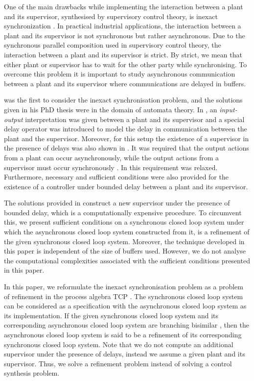 \documentclass[copyright]{eptcs}
\theoremstyle{plain}
\theoremstyle{definition}
\begin{document}
One of the main drawbacks while implementing the interaction between a plant and its supervisor, synthesised by supervisory control theory, is inexact synchronization \citep{fabian}. In practical industrial applications, the interaction between a plant and its supervisor is not synchronous but rather asynchronous. Due to the synchronous parallel composition used in supervisory control theory, the interaction between a plant and its supervisor is strict. By strict, we mean that either plant or supervisor has to wait for the other party while synchronising. To overcome this problem it is important to study asynchronous communication between a plant and its supervisor where communications are delayed in buffers.

\citeauthor{balemiphdt} was the first to consider the inexact synchronisation problem, and the solutions given in his PhD thesis \citep{balemiphdt} were in the domain of automata theory. In \citep{balemiphdt}, an \textit{input-output} interpretation was given between a plant and its supervisor and a special delay operator was introduced to model the delay in communication between the plant and the supervisor. Moreover, for this setup the existence of a supervisor in the presence of delays was also shown in \citep{balemiphdt}. It was required that the output actions from a plant can occur asynchronously, while the output actions from a supervisor must occur synchronously \citep{async-imp}. In \citep{async-imp} this requirement was relaxed. Furthermore, necessary and sufficient conditions were also provided for the existence of a controller under bounded delay between a plant and its supervisor.

The solutions provided in \citep{balemiphdt,async-imp} construct a new supervisor under the presence of bounded delay, which is a computationally expensive procedure. To circumvent this, we present sufficient conditions on a synchronous closed loop system under which the asynchronous closed loop system constructed from it, is a refinement of the given synchronous closed loop system. Moreover, the technique developed in this paper is independent of the size of buffers used. However, we do not analyse the computational complexities associated with the sufficient conditions presented in this paper.

In this paper, we reformulate the inexact synchronisation problem as a problem of refinement in the process algebra TCP \citep{acpbook}. The synchronous closed loop system can be considered as a specification with the asynchronous closed loop system as its implementation. If the given synchronous closed loop system and its corresponding asynchronous closed loop system are branching bisimilar \citep{Glabeek90}, then the asynchronous closed loop system is said to be a refinement of its corresponding synchronous closed loop system. Note that we do not compute an additional supervisor under the presence of delays, instead we assume a given plant and its supervisor. Thus, we solve a refinement problem instead of solving a control synthesis problem.
\end{document}
